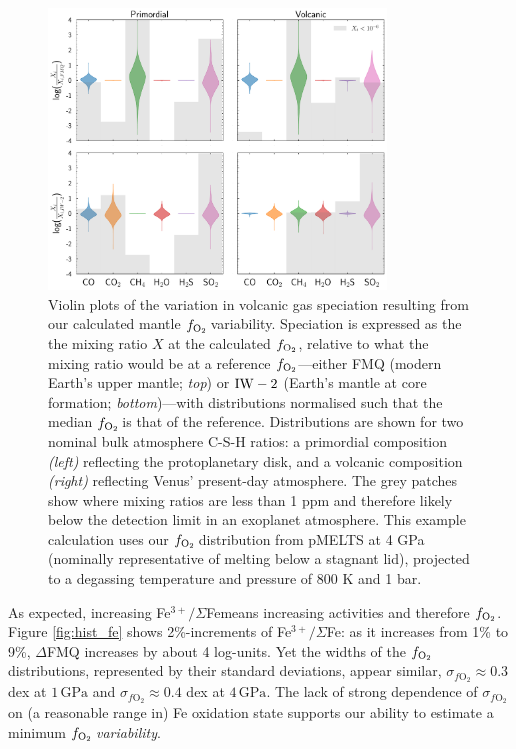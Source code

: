 \documentclass[fleqn,usenatbib,twocolumn]{mnras}
\newcommand{\fo}{$f_{\ce{O2}}$}
\newcommand{\xfer}{Fe$^{3+}/\Sigma$Fe}
\newcommand{\todo}[1]{\textit{\textcolor{violet}{{#1}}}}
\begin{document}
\begin{figure}
\centering
\includegraphics[width=0.8\textwidth]{figs/violins.pdf}
\caption{\label{fig:speciation}Violin plots of the variation in volcanic gas speciation resulting from our calculated mantle \fo\,variability. Speciation is expressed as the the mixing ratio $X$ at the calculated \fo, relative to what the mixing ratio would be at a reference \fo---either FMQ (modern Earth's upper mantle; \textit{top}) or ${\rm IW} - 2$ (Earth's mantle at core formation; \textit{bottom})---with distributions normalised such that the median \fo\,is that of the reference. Distributions are shown for two nominal bulk atmosphere C-S-H ratios: a primordial composition \textit{(left)} reflecting the protoplanetary disk, and a volcanic composition \textit{(right)} reflecting Venus' present-day atmosphere. The grey patches show where mixing ratios are less than 1 ppm and therefore likely below the detection limit in an exoplanet atmosphere. This example calculation uses our \fo\,distribution from pMELTS at 4 GPa (nominally representative of melting below a stagnant lid), projected to a degassing temperature and pressure of 800 K and 1 bar.}
\end{figure}

As expected, increasing \xfer\;means increasing  activities and therefore \fo. Figure \ref{fig:hist_fe} shows 2\%-increments of \xfer: as it increases from 1\% to 9\%, $\Delta$FMQ increases by about 4 log-units. Yet the widths of the \fo\,distributions, represented by their standard deviations, appear similar, $\sigma_{f\text{O}_2} \approx 0.3$ dex at $1\,\text{GPa}$ and $\sigma_{f\text{O}_2} \approx 0.4$ dex at $4\,\text{GPa}$. The lack of strong dependence of $\sigma_{f\text{O}_2}$ on (a reasonable range in) Fe oxidation state supports our ability to estimate a minimum \fo\,\emph{variability}.%
\end{document}
